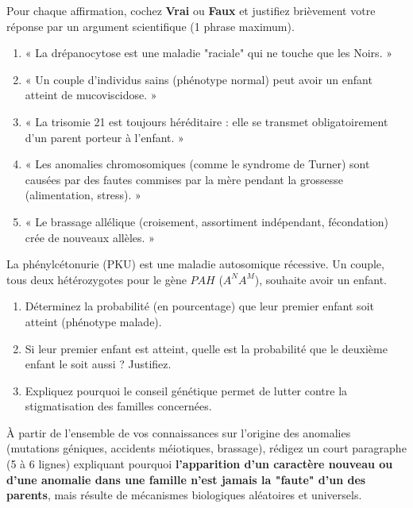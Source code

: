 \documentclass[11pt]{article}
\begin{document}
\begin{exercice}
Pour chaque affirmation, cochez \textbf{Vrai} ou \textbf{Faux} et justifiez brièvement votre réponse par un argument scientifique (1 phrase maximum).
\begin{enumerate}
    \item « La drépanocytose est une maladie "raciale" qui ne touche que les Noirs. »
    \item « Un couple d'individus sains (phénotype normal) peut avoir un enfant atteint de mucoviscidose. »
    \item « La trisomie 21 est toujours héréditaire : elle se transmet obligatoirement d'un parent porteur à l'enfant. »
    \item « Les anomalies chromosomiques (comme le syndrome de Turner) sont causées par des fautes commises par la mère pendant la grossesse (alimentation, stress). »
    \item « Le brassage allélique (croisement, assortiment indépendant, fécondation) crée de nouveaux allèles. »
\end{enumerate}
\end{exercice}

\begin{exercice}
La phénylcétonurie (PKU) est une maladie autosomique récessive. Un couple, tous deux hétérozygotes pour le gène $PAH$ ($A^N A^M$), souhaite avoir un enfant.
\begin{enumerate}
    \item Déterminez la probabilité (en pourcentage) que leur premier enfant soit atteint (phénotype malade).
    \item Si leur premier enfant est atteint, quelle est la probabilité que le deuxième enfant le soit aussi ? Justifiez.
    \item Expliquez pourquoi le conseil génétique permet de lutter contre la stigmatisation des familles concernées.
\end{enumerate}
\end{exercice}

\begin{exercice}
À partir de l'ensemble de vos connaissances sur l'origine des anomalies (mutations géniques, accidents méiotiques, brassage), rédigez un court paragraphe (5 à 6 lignes) expliquant pourquoi \textbf{l'apparition d'un caractère nouveau ou d'une anomalie dans une famille n'est jamais la "faute" d'un des parents}, mais résulte de mécanismes biologiques aléatoires et universels.
\end{exercice}
\end{document}
